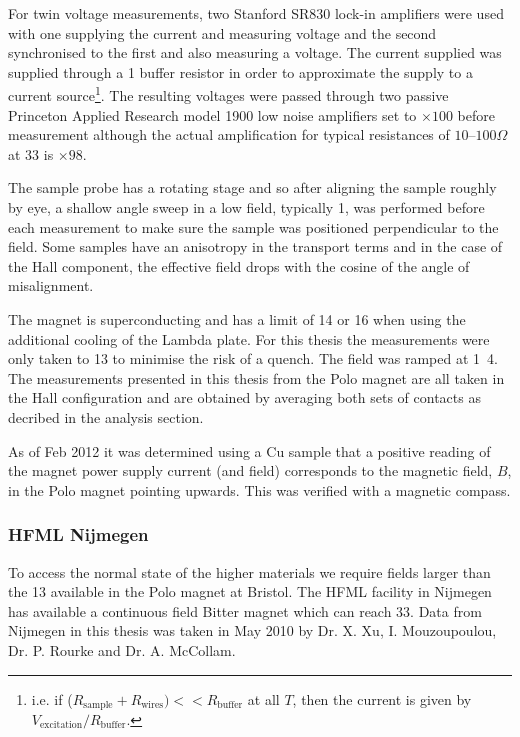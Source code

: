 For twin voltage measurements, two Stanford SR830 lock-in amplifiers were used with one supplying the current and measuring voltage and the second synchronised to the first and also measuring a voltage. The current supplied was supplied through a \unit{1}{\kilo\ohm} buffer resistor in order to approximate the supply to a current source\footnote{i.e. if ($R_{\textrm{sample}} + R_{\textrm{wires}}) << R_{\textrm{buffer}} $ at all $T$, then the current is given by $V_{\textrm{excitation}}/R_{\textrm{buffer}}$.}. The resulting voltages were passed through two passive Princeton Applied Research model 1900 low noise amplifiers set to $\times100$ before measurement although the actual amplification for typical resistances of $10$--$100\Omega$ at \unit{33}{\hertz} is $\times 98$.

The sample probe has a rotating stage and so after aligning the sample roughly by eye, a shallow angle sweep in a low field, typically \unit{1}{\tesla}, was performed before each measurement to make sure the sample was positioned perpendicular to the field. Some samples have an anisotropy in the transport terms and in the case of the Hall component, the effective field drops with the cosine of the angle of misalignment.

The magnet is superconducting and has a limit of \unit{14}{\tesla} or \unit{16}{\tesla} when using the additional cooling of the Lambda plate. For this thesis the measurements were only taken to \unit{13}{\tesla} to minimise the risk of a quench. The field was ramped at \unit{1.4}{\tesla\per\minute}. The measurements presented in this thesis from the Polo magnet are all taken in the Hall configuration and are obtained by averaging both sets of contacts as decribed in the analysis section.

As of Feb 2012 it was determined using a Cu sample that a positive reading of the magnet power supply current (and field) corresponds to the magnetic field, $B$, in the Polo magnet pointing upwards. This was verified with a magnetic compass.


\subsubsection{\ac{HFML} Nijmegen}

To access the normal state of the higher \Tc materials we require fields larger than the \unit{13}{\tesla} available in the Polo magnet at Bristol. The \ac{HFML} facility in Nijmegen has available a continuous field Bitter magnet which can reach \unit{33}{\tesla}. Data from Nijmegen in this thesis was taken in May 2010 by Dr. X. Xu, I. Mouzoupoulou, Dr. P. Rourke and Dr. A. McCollam.

